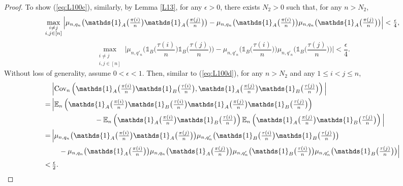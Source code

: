 \begin{proof}
To show (\ref{eq:L100c}), similarly, by Lemma \ref{L13}, for any $\epsilon > 0$, there exists $N_2 > 0$ such that, for any $n > N_2$,
\[
\textstyle\max\limits_{\substack{ i \neq j\\
                                   i, j \in [n]}}
    \Big| \n \big(\mathds{1}_A\big(\frac{\pi(i)}{n}\big)\mathds{1}_A\big(\frac{\pi(j)}{n}\big)\big) -
     \n \big(\mathds{1}_A\big(\frac{\pi(i)}{n}\big)\big) \n \big(\mathds{1}_A\big(\frac{\pi(j)}{n}\big)\big) \Big| < \frac{\epsilon}{4},
\]
\[
\textstyle\max\limits_{\substack{ i \neq j\\
                                   i, j \in [n]}}
    \Big| \mu_{n, q'_n} \big(\mathds{1}_B\big(\frac{\tau(i)}{n}\big)\mathds{1}_B\big(\frac{\tau(j)}{n}\big)\big) -
     \mu_{n, q'_n} \big(\mathds{1}_B\big(\frac{\tau(i)}{n}\big)\big) \mu_{n, q'_n} \big(\mathds{1}_B\big(\frac{\tau(j)}{n}\big)\big) \Big|
     < \frac{\epsilon}{4}.
\]
Without loss of generality, assume $0 < \epsilon < 1$. Then, similar to (\ref{eq:L100d}), for any $n > N_2$ and any $ 1 \le i < j \le n$,
\begin{align}
  &\textstyle\Big|\cov_n\left(\mathds{1}_A\big(\frac{\pi(i)}{n}\big)\mathds{1}_B\big(\frac{\tau(i)}{n}\big),
    \mathds{1}_A\big(\frac{\pi(j)}{n}\big)\mathds{1}_B\big(\frac{\tau(j)}{n}\big) \right)\Big| \label{eq:L100g}\\
  =\,&\textstyle\Big|\E_n\left(\mathds{1}_A\big(\frac{\pi(i)}{n}\big)\mathds{1}_B\big(\frac{\tau(i)}{n}\big)
             \mathds{1}_A\big(\frac{\pi(j)}{n}\big)\mathds{1}_B\big(\frac{\tau(j)}{n}\big) \right) \nonumber\\
           &\textstyle\qquad\qquad\qquad   -
             \E_n\left(\mathds{1}_A\big(\frac{\pi(i)}{n}\big)\mathds{1}_B\big(\frac{\tau(i)}{n}\big)\right)
             \E_n\left(\mathds{1}_A\big(\frac{\pi(j)}{n}\big)\mathds{1}_B\big(\frac{\tau(j)}{n}\big)\right) \Big| \nonumber\\
  =\,&\textstyle\Big|\n \big(\mathds{1}_A\big(\frac{\pi(i)}{n}\big)\mathds{1}_A\big(\frac{\pi(j)}{n}\big)\big)
\mu_{n, q'_n} \big(\mathds{1}_B\big(\frac{\tau(i)}{n}\big)\mathds{1}_B\big(\frac{\tau(j)}{n}\big)\big) \nonumber\\
           &\textstyle\quad - \n \big(\mathds{1}_A\big(\frac{\pi(i)}{n}\big)\big) \n \big(\mathds{1}_A\big(\frac{\pi(j)}{n}\big)\big)
           \mu_{n, q'_n} \big(\mathds{1}_B\big(\frac{\tau(i)}{n}\big)\big) \mu_{n, q'_n} \big(\mathds{1}_B\big(\frac{\tau(j)}{n}\big)\big) \Big| \nonumber\\
  <\,&\textstyle \frac{\epsilon}{2}.   \nonumber

\end{align}
\end{proof}
